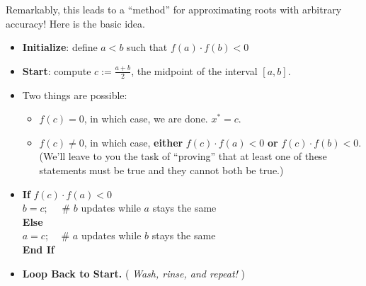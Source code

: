 Remarkably, this leads to a ``method'' for approximating roots with arbitrary accuracy! Here is the basic idea.

\begin{tcolorbox}[title=\textbf{\large Bisection Algorithm Pseudo Code}]
\begin{itemize}
\item \textbf{Initialize}: define $a < b$ such that $f(a) \cdot f(b) < 0$
    \item \textbf{Start}: compute $c:=\frac{a+b}{2}$, the midpoint of the interval $[a, b]$. 
    \item Two things are possible: 
    \begin{itemize}
    \setlength{\itemsep}{.2cm}
        \item $f(c)=0$, in which case, we are done. $x^\ast=c.$
        \item $f(c) \neq 0$, in which case, \textbf{either} $f(c) \cdot f(a) < 0$ \textbf{or} $f(c) \cdot f(b) < 0$. (We'll leave to you the task of ``proving'' that at least one of these statements must be true and they cannot both be true.)
                    
    \end{itemize}
        \item \textbf{If}  $f(c) \cdot f(a) < 0$\\
        \hspace*{.3cm}$b =c;$  ~~\# $b$ updates while $a$ stays the same\\
        \textbf{Else}\\
        \hspace*{.3cm} $a =c$;  ~~\# $a$ updates while $b$ stays the same\\
        \textbf{End If}\\
        \item  \textbf{Loop Back to Start.} ( \textit{Wash, rinse, and repeat!} )
\end{itemize}
\end{tcolorbox}


